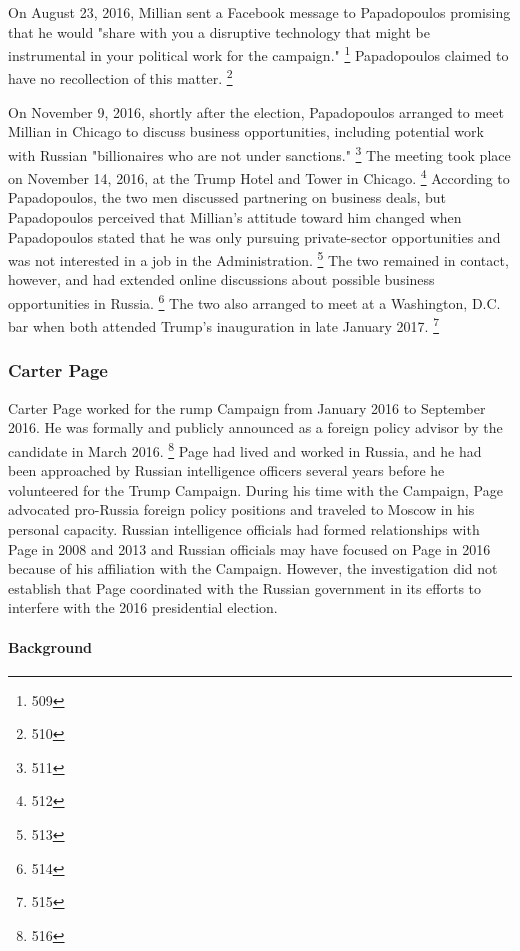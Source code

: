 On August 23, 2016, Millian sent a Facebook message to Papadopoulos promising that he would "share with you a disruptive technology that might be instrumental in your political work for the campaign."%
\footnote{509}
Papadopoulos claimed to have no recollection of this matter.%
\footnote{510}

On November 9, 2016, shortly after the election, Papadopoulos arranged to meet Millian in Chicago to discuss business opportunities, including potential work with Russian "billionaires who are not under sanctions."%
\footnote{511}
The meeting took place on November 14, 2016, at the Trump Hotel and Tower in Chicago.%
\footnote{512}
According to Papadopoulos, the two men discussed partnering on business deals, but Papadopoulos perceived that Millian's attitude toward him changed when Papadopoulos stated that he was only pursuing private-sector opportunities and was not interested in a job in the Administration.%
\footnote{513}
The two remained in contact, however, and had extended online discussions about possible business opportunities in Russia.%
\footnote{514}
The two also arranged to meet at a Washington, D.C. bar when both attended Trump's inauguration in late January 2017.%
\footnote{515}

\subsubsection{Carter Page}

Carter Page worked for the rump Campaign from January 2016 to September 2016.
He was formally and publicly announced as a foreign policy advisor by the candidate in March 2016.%
\footnote{516}
Page had lived and worked in Russia, and he had been approached by Russian intelligence officers several years before he volunteered for the Trump Campaign.
During his time with the Campaign, Page advocated pro-Russia foreign policy positions and traveled to Moscow in his personal capacity.
Russian intelligence officials had formed relationships with Page in 2008 and 2013 and Russian officials may have focused on Page in 2016 because of his affiliation with the Campaign.
However, the investigation did not establish that Page coordinated with the Russian government in its efforts to interfere with the 2016 presidential election.

\paragraph{Background}

